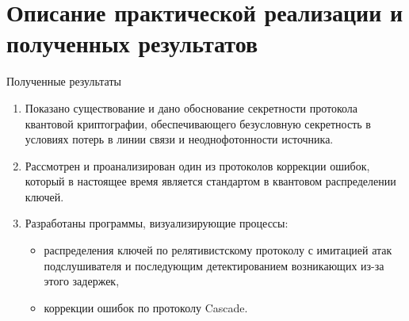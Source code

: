 \documentclass[aspectratio=43, notes=hide]{beamer}
\begin{document}
\section{Описание практической реализации и полученных результатов}
 \begin{frame}{Полученные результаты}
   \begin{enumerate}
     \item Показано существование и дано обоснование секретности протокола квантовой криптографии, обеспечивающего безусловную секретность в условиях потерь в линии связи и неоднофотонности источника.
      \item Рассмотрен и проанализирован один из протоколов коррекции ошибок, который в настоящее время является стандартом в квантовом распределении ключей.
\item Разработаны программы, визуализирующие процессы:
\begin{itemize}
  \item распределения ключей по релятивистскому протоколу с имитацией атак подслушивателя и последующим детектированием возникающих из-за этого задержек,
  \item коррекции ошибок по протоколу Cascade.
\end{itemize}
   \end{enumerate}
 \end{frame}
 



\maketitle
\end{document}
